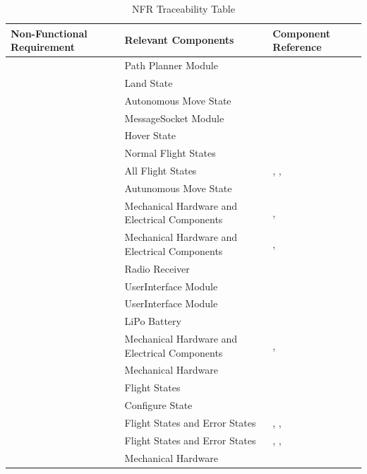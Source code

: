 \documentclass[12pt, titlepage]{article}
\begin{document}
\begin{table}[!h]
\begin{center}
\caption {NFR Traceability Table}
\label{tab:NFR_DesignTrace}
\begin{tabular}{ | m{2.5cm} | m{7.5cm} | m{6.5cm} | } 
\hline
Non-Functional Requirement & Relevant Components & Component Reference \\
\hline
\nameref{PERF_001} & Path Planner Module & \nameref{Path Plan App} \\ \hline
\nameref{PERF_002} & Land State & \nameref{FlightStates} \\ \hline
\nameref{PERF_003} & Autonomous Move State & \nameref{FlightStates} \\ \hline
\nameref{PERF_004} & MessageSocket Module & \nameref{MIS_MESSAGE_SOCKET} \\ \hline
\nameref{PERF_005} & Hover State & \nameref{FlightStates} \\ \hline
\nameref{PERF_006} & Normal Flight States & \nameref{FlightStates} \\ \hline
\nameref{PERF_007} & All Flight States & \nameref{FlightStates}, \nameref{NonFlightStates}, \nameref{ErrorStates} \\ \hline
\nameref{PERF_008} & Autunomous Move State & \nameref{FlightStates} \\ \hline
\nameref{DES_001} & Mechanical Hardware and Electrical Components & \nameref{sec:mechHardware}, \nameref{sec:elecComponents} \\ \hline
\nameref{STD_001} & Mechanical Hardware and Electrical Components & \nameref{sec:mechHardware}, \nameref{sec:elecComponents} \\ \hline
\nameref{STD_002} & Radio Receiver & \nameref{sec:elecComponents} \\ \hline
\nameref{SEC_001} & UserInterface Module & \nameref{MIS_USER_INTERFACE} \\ \hline
\nameref{SEC_002} & UserInterface Module & \nameref{MIS_USER_INTERFACE} \\ \hline
\nameref{MTNC_001} & LiPo Battery & \nameref{sec:elecComponents} \\ \hline
\nameref{MTNC_002} & Mechanical Hardware and Electrical Components & \nameref{sec:mechHardware}, \nameref{sec:elecComponents} \\ \hline
\nameref{MTNC_003} & Mechanical Hardware & \nameref{sec:mechHardware} \\ \hline
\nameref{SAFE_001} & Flight States & \nameref{FlightStates} \\ \hline
\nameref{SAFE_002} & Configure State & \nameref{NonFlightStates} \\ \hline
\nameref{SAFE_003} & Flight States and Error States & \nameref{FlightStates}, \nameref{NonFlightStates}, \nameref{ErrorStates} \\ \hline
\nameref{SAFE_004} & Flight States and Error States & \nameref{FlightStates}, \nameref{NonFlightStates}, \nameref{ErrorStates} \\ \hline
\nameref{SAFE_005} & Mechanical Hardware & \nameref{sec:mechHardware} \\ \hline
\end{tabular}
\end{center}
\end{table}
\end{document}
